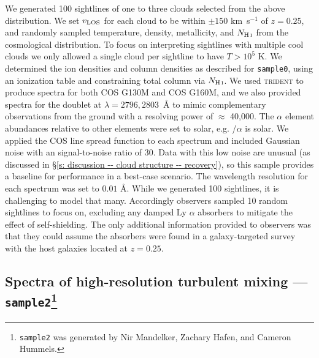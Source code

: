 \documentclass[fleqn,usenatbib]{mnras}
\def\kms{\hbox{km~s$^{-1}$}}
\begin{document}
We generated 100 sightlines of one to three clouds selected from the above distribution. We set $v_{\rm LOS}$ for each cloud to be within $\pm150$ {\kms} of $z=0.25$, and randomly sampled temperature, density, metallicity, and $N_{\ion{H}{I}}$ from the cosmological distribution.
To focus on interpreting sightlines with multiple cool clouds we only allowed a single cloud per sightline to have $T>10^5$ K.
We determined the ion densities and column densities as described for \texttt{sample0}, using an ionization table and constraining total column via $N_{\ion{H}{I}}$.
We used \textsc{trident} to produce spectra for both COS G130M and COS G160M, and we also provided spectra for the  doublet at $\lambda = 2796, 2803$~{\AA} to mimic complementary observations from the ground with a resolving power of $\approx$ 40,000.
The $\alpha$ element abundances relative to other elements were set to solar, e.g. /$\alpha$ is solar.
We applied the COS line spread function to each spectrum and included Gaussian noise with an signal-to-noise ratio of 30.
Data with this low noise are unusual (as discussed in \S\ref{s: discussion -- cloud structure -- recovery}), so this sample provides a baseline for performance in a best-case scenario.
The wavelength resolution for each spectrum was set to $0.01$ \AA.
While we generated 100 sightlines, it is challenging to model that many.
Accordingly observers sampled 10 random sightlines to focus on, excluding any damped Ly $\alpha$ absorbers to mitigate the effect of self-shielding.
The only additional information provided to observers was that they could assume the absorbers were found in a galaxy-targeted survey with the host galaxies located at $z=0.25$.

\subsection[Spectra of high-resolution turbulent mixing --- \texttt{sample2}]{Spectra of high-resolution turbulent mixing --- \texttt{sample2}\footnote{
\texttt{sample2} was generated by Nir Mandelker, Zachary Hafen, and Cameron Hummels.}}
\label{s: data generation -- sample2}
\end{document}
